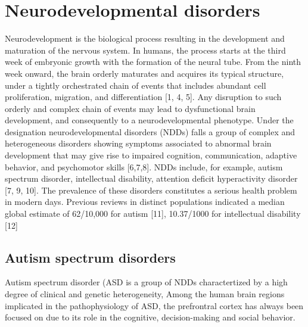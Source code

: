 \documentclass[12pt]{article}
\begin{document}
\section{Neurodevelopmental disorders}
Neurodevelopment is the biological process resulting in the development and maturation of the nervous system.
In humans, the process starts at the third week of embryonic growth with the formation of the neural tube.
 From the ninth week onward, the brain orderly maturates and acquires its typical structure, under a tightly orchestrated chain of events that includes abundant cell proliferation, migration, and differentiation [1, 4, 5]. 
 Any disruption to such orderly and complex chain of events may lead to dysfunctional brain development, and consequently to a neurodevelopmental phenotype.
  Under the designation neurodevelopmental disorders (NDDs) falls a group of complex and heterogeneous disorders showing symptoms associated to abnormal brain development that may give rise to impaired cognition, communication, adaptive behavior, and psychomotor skills [6,7,8]. 
NDDs include, for example, autism spectrum disorder, intellectual disability, attention deficit hyperactivity disorder [7, 9, 10]. 
The prevalence of these disorders constitutes a serious health problem in modern days. 
Previous reviews in distinct populations indicated a median global estimate of 62/10,000 for autism [11], 10.37/1000 for intellectual disability [12]
\subsection{Autism spectrum disorders}
Autism spectrum disorder (ASD is a group of NDDs charactertized by a high degree of clinical and genetic heterogeneity,
Among the human brain regions implicated in the pathophysiology of ASD, the prefrontral cortex has always been focused on due to its role in the cognitive, decision-making and social behavior.
\end{document}
